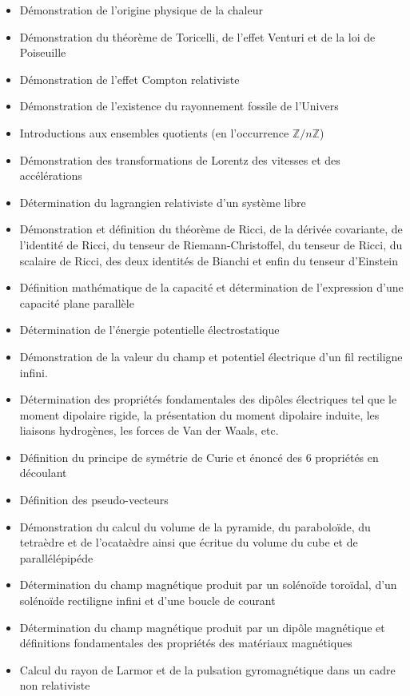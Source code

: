 \documentclass[12pt,a4paper,twoside,openright]{report}
\theoremstyle{definition}
\theoremstyle{itexmp}
\numberwithin{equation}{section}
\begin{document}
\begin{itemize}
\begin{itemize}[noitemsep]
			\item Démonstration de l'origine physique de la chaleur
				\item Démonstration du théorème de Toricelli, de l'effet Venturi et de la loi de Poiseuille
				\item Démonstration de l'effet Compton relativiste
				\item Démonstration de l'existence du rayonnement fossile de l'Univers
				\item Introductions aux ensembles quotients (en l'occurrence $\mathbb{Z}/n\mathbb{Z}$)
				\item Démonstration des transformations de Lorentz des vitesses et des accélérations
				\item Détermination du lagrangien relativiste d'un système libre
				\item Démonstration et définition du théorème de Ricci, de la dérivée covariante, de l'identité de Ricci, du tenseur de Riemann-Christoffel, du tenseur de Ricci, du scalaire de Ricci, des deux identités de Bianchi et enfin du tenseur d'Einstein
				\item Définition mathématique de la capacité et détermination de l'expression d'une capacité plane parallèle 
				\item Détermination de l'énergie potentielle électrostatique
				\item Démonstration de la valeur du champ et potentiel électrique d'un fil rectiligne infini.
				\item Détermination des propriétés fondamentales des dipôles électriques tel que le moment dipolaire rigide, la présentation du moment dipolaire induite, les liaisons hydrogènes, les forces de Van der Waals, etc.
				\item Définition du principe de symétrie de Curie et énoncé des 6 propriétés en découlant
				\item Définition des pseudo-vecteurs
				\item Démonstration du calcul du volume de la pyramide, du paraboloïde, du tetraèdre et de l'ocataèdre ainsi que écritue du volume du cube et de parallélépipéde
				\item Détermination du champ magnétique produit par un solénoïde toroïdal, d'un solénoïde rectiligne infini et d'une boucle de courant
				\item Détermination du champ magnétique produit par un dipôle magnétique et définitions fondamentales des propriétés des matériaux magnétiques 
				\item Calcul du rayon de Larmor et de la pulsation gyromagnétique dans un cadre non relativiste

\end{itemize}
\end{itemize}
\end{document}
